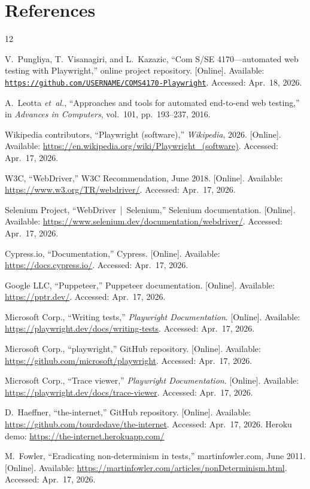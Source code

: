 \documentclass[12pt,letterpaper]{article}
\newcommand{\OurRepoURL}{https://github.com/USERNAME/COMS4170-Playwright}
\begin{document}
\section*{References}

\begin{thebibliography}{12}

V.~Pungliya, T.~Visanagiri, and L.~Kazazic, ``Com S/SE 4170---automated web testing with Playwright,'' online project repository. [Online]. Available: \href{\OurRepoURL}{\texttt{\OurRepoURL}}. Accessed: Apr.~18, 2026.

A.~Leotta \emph{et~al.}, ``Approaches and tools for automated end-to-end web testing,'' in \emph{Advances in Computers}, vol.~101, pp.~193--237, 2016.

Wikipedia contributors, ``Playwright (software),'' \emph{Wikipedia}, 2026. [Online]. Available: \url{https://en.wikipedia.org/wiki/Playwright_(software)}. Accessed: Apr.~17, 2026.

W3C, ``WebDriver,'' W3C Recommendation, June 2018. [Online]. Available: \url{https://www.w3.org/TR/webdriver/}. Accessed: Apr.~17, 2026.

Selenium Project, ``WebDriver~|~Selenium,'' Selenium documentation. [Online]. Available: \url{https://www.selenium.dev/documentation/webdriver/}. Accessed: Apr.~17, 2026.

Cypress.io, ``Documentation,'' Cypress. [Online]. Available: \url{https://docs.cypress.io/}. Accessed: Apr.~17, 2026.

Google LLC, ``Puppeteer,'' Puppeteer documentation. [Online]. Available: \url{https://pptr.dev/}. Accessed: Apr.~17, 2026.

Microsoft Corp., ``Writing tests,'' \emph{Playwright Documentation}. [Online]. Available: \url{https://playwright.dev/docs/writing-tests}. Accessed: Apr.~17, 2026.

Microsoft Corp., ``playwright,'' GitHub repository. [Online]. Available: \url{https://github.com/microsoft/playwright}. Accessed: Apr.~17, 2026.

Microsoft Corp., ``Trace viewer,'' \emph{Playwright Documentation}. [Online]. Available: \url{https://playwright.dev/docs/trace-viewer}. Accessed: Apr.~17, 2026.

D.~Haeffner, ``the-internet,'' GitHub repository. [Online]. Available: \url{https://github.com/tourdedave/the-internet}. Accessed: Apr.~17, 2026. Heroku demo: \url{https://the-internet.herokuapp.com/}

M.~Fowler, ``Eradicating non-determinism in tests,'' martinfowler.com, June 2011. [Online]. Available: \url{https://martinfowler.com/articles/nonDeterminism.html}. Accessed: Apr.~17, 2026.

\end{thebibliography}
\end{document}
